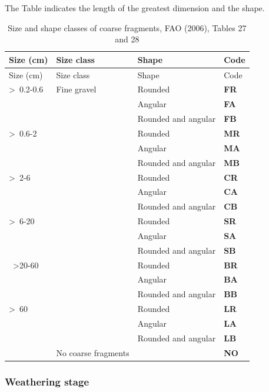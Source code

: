 \documentclass[
  letterpaper,
  DIV=11,
  numbers=noendperiod]{scrreprt}
\begin{document}
The Table indicates the length of the greatest dimension and the shape.

\begin{longtable}[]{@{}llll@{}}
\caption{Size and shape classes of coarse fragments, FAO (2006), Tables
27 and 28}\tabularnewline
\toprule()
Size (cm) & Size class & Shape & Code \\
\midrule()
\endfirsthead
\toprule()
Size (cm) & Size class & Shape & Code \\
\midrule()
\endhead
\textgreater~0.2-0.6 & Fine gravel & Rounded & \textbf{FR} \\
& & Angular & \textbf{FA} \\
& & Rounded and angular & \textbf{FB} \\
\textgreater~0.6-2 & & Rounded & \textbf{MR} \\
& & Angular & \textbf{MA} \\
& & Rounded and angular & \textbf{MB} \\
\textgreater~2-6 & & Rounded & \textbf{CR} \\
& & Angular & \textbf{CA} \\
& & Rounded and angular & \textbf{CB} \\
\textgreater~6-20 & & Rounded & \textbf{SR} \\
& & Angular & \textbf{SA} \\
& & Rounded and angular & \textbf{SB} \\
~\textgreater20-60 & & Rounded & \textbf{BR} \\
& & Angular & \textbf{BA} \\
& & Rounded and angular & \textbf{BB} \\
\textgreater~60 & & Rounded & \textbf{LR} \\
& & Angular & \textbf{LA} \\
& & Rounded and angular & \textbf{LB} \\
& No coarse fragments & & \textbf{NO} \\
\bottomrule()
\end{longtable}

\hypertarget{weathering-stage}{%
\subsubsection{Weathering stage}\label{weathering-stage}}
\end{document}
